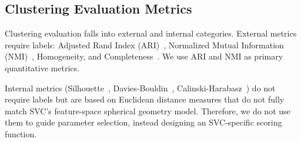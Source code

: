 \subsection{Clustering Evaluation Metrics}

Clustering evaluation falls into external and internal categories. External metrics require labels: Adjusted Rand Index (ARI)~\cite{hubert1985}, Normalized Mutual Information (NMI)~\cite{strehl2002}, Homogeneity, and Completeness~\cite{rosenberg2007}. We use ARI and NMI as primary quantitative metrics.

Internal metrics (Silhouette~\cite{rousseeuw1987}, Davies-Bouldin~\cite{davies1979}, Calinski-Harabasz~\cite{calinski1974}) do not require labels but are based on Euclidean distance measures that do not fully match SVC's feature-space spherical geometry model. Therefore, we do not use them to guide parameter selection, instead designing an SVC-specific scoring function.
